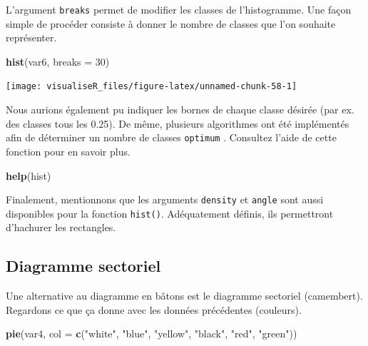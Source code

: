 \documentclass[]{article}
\newenvironment{Shaded}{\begin{snugshade}}{\end{snugshade}}
\newcommand{\DataTypeTok}[1]{\textcolor[rgb]{0.13,0.29,0.53}{#1}}
\newcommand{\DecValTok}[1]{\textcolor[rgb]{0.00,0.00,0.81}{#1}}
\newcommand{\KeywordTok}[1]{\textcolor[rgb]{0.13,0.29,0.53}{\textbf{#1}}}
\newcommand{\NormalTok}[1]{#1}
\newcommand{\StringTok}[1]{\textcolor[rgb]{0.31,0.60,0.02}{#1}}
\begin{document}
L'argument \texttt{breaks} permet de modifier les classes de l'histogramme. Une façon
simple de procéder consiste à donner le nombre de classes que l'on souhaite
représenter.

\begin{Shaded}
\begin{Highlighting}[]
\KeywordTok{hist}\NormalTok{(var6, }\DataTypeTok{breaks =} \DecValTok{30}\NormalTok{)}
\end{Highlighting}
\end{Shaded}

\begin{center}\texttt{[image: visualiseR\_files/figure-latex/unnamed-chunk-58-1]} \end{center}

Nous aurions également pu indiquer les bornes de chaque classe désirée (par ex.
des classes tous les 0.25). De même, plusieurs algorithmes ont été implémentés
afin de déterminer un nombre de classes \texttt{optimum} . Consultez l'aide de cette
fonction pour en savoir plus.

\begin{Shaded}
\begin{Highlighting}[]
\KeywordTok{help}\NormalTok{(hist)}
\end{Highlighting}
\end{Shaded}

Finalement, mentionnons que les arguments \texttt{density} et \texttt{angle} sont aussi disponibles pour la fonction \texttt{hist()}. Adéquatement définis, ils permettront d'hachurer les rectangles.

\hypertarget{diagramme-sectoriel}{%
\subsection{Diagramme sectoriel}\label{diagramme-sectoriel}}

Une alternative au diagramme en bâtons est le diagramme sectoriel (camembert). Regardons ce que ça donne avec les données précédentes (couleurs).

\begin{Shaded}
\begin{Highlighting}[]
\KeywordTok{pie}\NormalTok{(var4, }\DataTypeTok{col =} \KeywordTok{c}\NormalTok{(}\StringTok{"white"}\NormalTok{, }\StringTok{"blue"}\NormalTok{, }\StringTok{"yellow"}\NormalTok{, }\StringTok{"black"}\NormalTok{, }\StringTok{"red"}\NormalTok{, }\StringTok{"green"}\NormalTok{))}
\end{Highlighting}
\end{Shaded}
\end{document}
